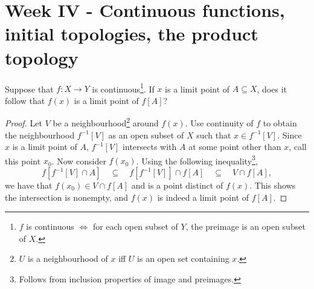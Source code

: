 \documentclass[../../main.tex]{subfiles}
\begin{document}
\section{Week IV - Continuous functions, initial topologies, the product topology}

\begin{problem}[1]
Suppose that $f : X \to Y$ is continuous\footnote{$f$ is continuous $\Leftrightarrow$ for each open subset of $Y$, the preimage is an open subset of $X$.}.
If $x$ is a limit point of $A \subseteq X$, does it follow that $f(x)$ is a limit point of $f[A]$?
\end{problem}
\begin{proof}
	Let $V$ be a neighbourhood\footnote{$U$ is a neighbourhood of $x$ iff $U$ is an open set containing $x$.}
	around $f(x)$.
	Use continuity of $f$ to obtain the neighbourhood $f^{-1}[V]$ as an open subset of $X$ such that $x \in f^{-1}[V]$.
	Since $x$ is a limit point of $A$, $f^{-1}[V]$ intersects with $A$ at some point other than $x$, call this point $x_0$.
	Now consider $f(x_0)$.
	Using the following inequality\footnote{Follows from inclusion properties of image and preimages.},
	\[
		f[f^{-1}[V] \cap A]
		\quad \subseteq \quad
		f[f^{-1}[V]] \cap f[A]
		\quad \subseteq \quad
		V \cap f[A],
	\]
	we have that $f(x_0) \in V \cap f[A]$ and is a point distinct of $f(x)$.
	This shows the intersection is nonempty, and $f(x)$ is indeed a limit point of $f[A]$.
\end{proof}
\end{document}
